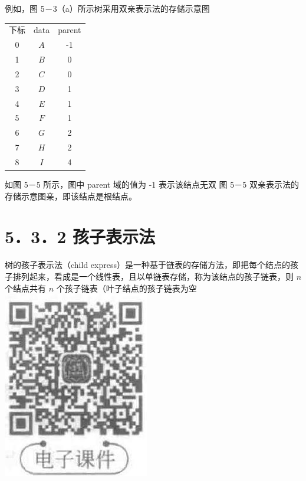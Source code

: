 \documentclass[10pt]{article}
\begin{document}
例如，图 5－3（a）所示树采用双亲表示法的存储示意图

\begin{center}
\begin{tabular}{c|c|c|}
下标 & \multicolumn{1}{c}{data} & \multicolumn{1}{c}{parent} \\
\cline { 2 - 3 }
0 & $A$ & -1 \\
\cline { 2 - 3 }
1 & $B$ & 0 \\
\hline
2 & $C$ & 0 \\
\hline
3 & $D$ & 1 \\
\hline
4 & $E$ & 1 \\
\hline
5 & $F$ & 1 \\
\hline
6 & $G$ & 2 \\
\hline
7 & $H$ & 2 \\
\hline
8 & $I$ & 4 \\
\hline
\end{tabular}
\end{center}如图 5－5 所示，图中 parent 域的值为 -1 表示该结点无双 图 5－5 双亲表示法的存储示意图亲，即该结点是根结点。

\section*{5．3．2 孩子表示法}
树的孩子表示法（child express）是一种基于链表的存储方法，即把每个结点的孩子排列起来，看成是一个线性表，且以单链表存储，称为该结点的孩子链表，则 $n$ 个结点共有 $n$ 个孩子链表（叶子结点的孩子链表为空\\
\includegraphics[max width=\textwidth, center]{2025_06_06_704745ea57b15b2333e5g-145}
\end{document}
